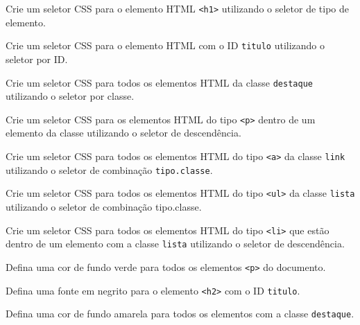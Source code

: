 \begin{exercise}
Crie um seletor CSS para o elemento HTML \texttt{<h1>} utilizando o seletor de tipo de elemento.
\end{exercise}

\begin{exercise}
Crie um seletor CSS para o elemento HTML com o ID \texttt{titulo} utilizando o seletor por ID.
\end{exercise}

\begin{exercise}
Crie um seletor CSS para todos os elementos HTML da classe \texttt{destaque} utilizando o seletor por classe.
\end{exercise}

\begin{exercise}
Crie um seletor CSS para os elementos HTML do tipo \texttt{<p>} dentro de um elemento da classe  utilizando o seletor de descendência.
\end{exercise}

\begin{exercise}
Crie um seletor CSS para todos os elementos HTML do tipo \texttt{<a>} da classe \texttt{link} utilizando o seletor de combinação \texttt{tipo.classe}.
\end{exercise}

\begin{exercise}
Crie um seletor CSS para todos os elementos HTML do tipo \texttt{<ul>} da classe \texttt{lista} utilizando o seletor de combinação tipo.classe.
\end{exercise}

\begin{exercise}
Crie um seletor CSS para todos os elementos HTML do tipo \texttt{<li>} que estão dentro de um elemento com a classe \texttt{lista} utilizando o seletor de descendência.
\end{exercise}

\begin{exercise}
Defina uma cor de fundo verde para todos os elementos \texttt{<p>} do documento.
\end{exercise}

\begin{exercise}
Defina uma fonte em negrito para o elemento \texttt{<h2>} com o ID \texttt{titulo}.
\end{exercise}

\begin{exercise}
Defina uma cor de fundo amarela para todos os elementos com a classe \texttt{destaque}.
\end{exercise}

